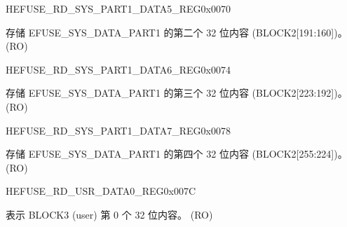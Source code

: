 \begin{register}{H}{EFUSE\_RD\_SYS\_PART1\_DATA5\_REG}{0x0070}\label{regdesc:EFUSERDSYSPART1DATA5REG}
%
\regnewline%
\begin{regdesc}\begin{reglist}
\label{fielddesc:EFUSESYSDATAPART15}\item [EFUSE\_SYS\_DATA\_PART1\_5] 存储 EFUSE\_SYS\_DATA\_PART1 的第二个 32 位内容 (BLOCK2[191:160])。 (RO)
\end{reglist}\end{regdesc}
\end{register}


\begin{register}{H}{EFUSE\_RD\_SYS\_PART1\_DATA6\_REG}{0x0074}\label{regdesc:EFUSERDSYSPART1DATA6REG}
%
\regnewline%
\begin{regdesc}\begin{reglist}
\label{fielddesc:EFUSESYSDATAPART16}\item [EFUSE\_SYS\_DATA\_PART1\_6] 存储 EFUSE\_SYS\_DATA\_PART1 的第三个 32 位内容 (BLOCK2[223:192])。 (RO)
\end{reglist}\end{regdesc}
\end{register}


\begin{register}{H}{EFUSE\_RD\_SYS\_PART1\_DATA7\_REG}{0x0078}\label{regdesc:EFUSERDSYSPART1DATA7REG}
%
\regnewline%
\begin{regdesc}\begin{reglist}
\label{fielddesc:EFUSESYSDATAPART17}\item [EFUSE\_SYS\_DATA\_PART1\_7] 存储 EFUSE\_SYS\_DATA\_PART1 的第四个 32 位内容 (BLOCK2[255:224])。 (RO)
\end{reglist}\end{regdesc}
\end{register}


\begin{register}{H}{EFUSE\_RD\_USR\_DATA0\_REG}{0x007C}\label{regdesc:EFUSERDUSRDATA0REG}
%
\regnewline%
\begin{regdesc}\begin{reglist}
\label{fielddesc:EFUSEUSRDATA0}\item [EFUSE\_USR\_DATA0] 表示 BLOCK3 (user) 第 0 个 32 位内容。 (RO)
\end{reglist}\end{regdesc}
\end{register}


